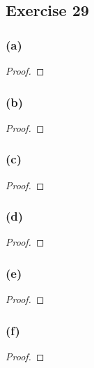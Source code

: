 \documentclass[14pt]{extarticle}
\begin{document}
\subsection{Exercise 29}

\subsubsection{(a)}

\begin{proof}

\end{proof}

\subsubsection{(b)}

\begin{proof}

\end{proof}

\subsubsection{(c)}

\begin{proof}

\end{proof}

\subsubsection{(d)}

\begin{proof}

\end{proof}

\subsubsection{(e)}

\begin{proof}

\end{proof}

\subsubsection{(f)}

\begin{proof}

\end{proof}
\end{document}
